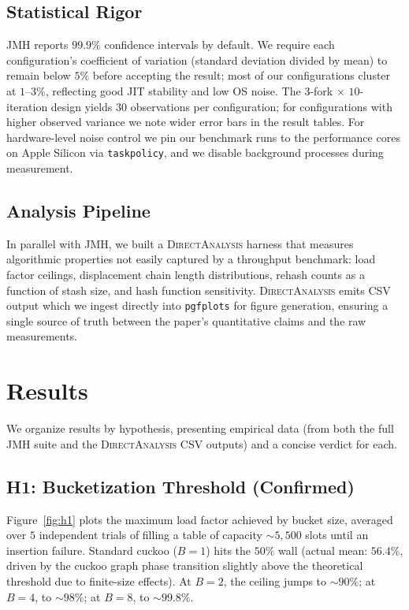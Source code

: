 \documentclass[10pt,journal,compsoc]{IEEEtran}
\begin{document}
\subsection{Statistical Rigor}
JMH reports $99.9\%$ confidence intervals by default. We require each configuration's coefficient of variation (standard deviation divided by mean) to remain below $5\%$ before accepting the result; most of our configurations cluster at $1$--$3\%$, reflecting good JIT stability and low OS noise. The $3$-fork $\times$ $10$-iteration design yields $30$ observations per configuration; for configurations with higher observed variance we note wider error bars in the result tables. For hardware-level noise control we pin our benchmark runs to the performance cores on Apple Silicon via \texttt{taskpolicy}, and we disable background processes during measurement.

\subsection{Analysis Pipeline}
In parallel with JMH, we built a \textsc{DirectAnalysis} harness that measures algorithmic properties not easily captured by a throughput benchmark: load factor ceilings, displacement chain length distributions, rehash counts as a function of stash size, and hash function sensitivity. \textsc{DirectAnalysis} emits CSV output which we ingest directly into \texttt{pgfplots} for figure generation, ensuring a single source of truth between the paper's quantitative claims and the raw measurements.

\section{Results}\label{sec:results}

We organize results by hypothesis, presenting empirical data (from both the full JMH suite and the \textsc{DirectAnalysis} CSV outputs) and a concise verdict for each.

\subsection{H1: Bucketization Threshold (Confirmed)}

Figure~\ref{fig:h1} plots the maximum load factor achieved by bucket size, averaged over $5$ independent trials of filling a table of capacity $\sim 5{,}500$ slots until an insertion failure. Standard cuckoo ($B=1$) hits the $50\%$ wall (actual mean: $56.4\%$, driven by the cuckoo graph phase transition slightly above the theoretical threshold due to finite-size effects). At $B=2$, the ceiling jumps to $\sim 90\%$; at $B=4$, to $\sim 98\%$; at $B=8$, to $\sim 99.8\%$.
\end{document}
